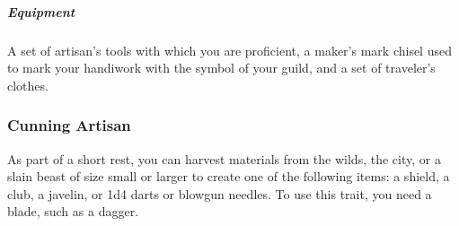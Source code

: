     \subparagraph{Equipment} A set of artisan's tools with which you are proficient, a maker's mark chisel used to mark your handiwork with the symbol of your guild, and a set of traveler's clothes.

    \subsubsection{Cunning Artisan} \label{feat::cunningartisan}
        As part of a short rest, you can harvest materials from the wilds, the city, or a slain beast of size small or larger to create one of the following items: a shield, a club, a javelin, or 1d4 darts or blowgun needles.
        To use this trait, you need a blade, such as a dagger.%

\thispagestyle{empty}

